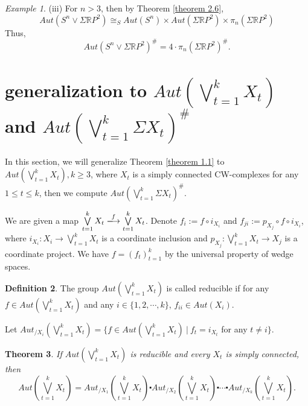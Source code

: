 \documentclass[12pt]{article}
\theoremstyle{theorem}
\newtheorem{theorem}{Theorem}[section]
\theoremstyle{definition}
\newtheorem{definition}[theorem]{Definition}
\theoremstyle{proposition}
\theoremstyle{corollary}
\theoremstyle{lemma}
\theoremstyle{remark}
\theoremstyle{example}
\newtheorem{example}[theorem]{Example}
\begin{document}
{\begin{example}
(iii) For $n>3$, then by Theorem \ref{theorem 2.6},
$$Aut(S^{n}\vee \Sigma \mathbb{R}P^2)\cong_{S}Aut(S^{n})\times Aut(\Sigma\mathbb{R}P^2)\times \pi_{n}(\Sigma\mathbb{R}P^2)$$
 Thus, $$ Aut(S^{n}\vee \Sigma \mathbb{R}P^2)^{\#}=4\cdot\pi_{n}(\Sigma\mathbb{R}P^2)^{\#}.$$
\end{example}

\section{ generalization to $Aut(\bigvee\limits_{t=1}^{k}X_{t})$ and  $Aut(\bigvee\limits_{t=1}^{k}\Sigma X_{t})^{\#}$  }
\label{sec:3}

In this section, we will generalize Theorem \ref{theorem 1.1} to $Aut(\bigvee\limits_{t=1}^{k}X_{t}), k\geq3$, where $X_{t}$ is a simply connected CW-complexes for any $1\leq t\leq k$, then we compute  $Aut(\bigvee\limits_{t=1}^{k}\Sigma X_{t})^{\#}$.

We are given a map $\bigvee\limits_{t=1}^{k}X_{t} \xlongrightarrow{f} \bigvee\limits_{t=1}^{k}X_{t}$. Denote $f_{i}:=f{\ensuremath{{\scriptstyle\circ}}} i_{X_{i}}$ and  $f_{ji}:=p_{X_{j}}{\ensuremath{{\scriptstyle\circ}}} f{\ensuremath{{\scriptstyle\circ}}} i_{X_{i}}$, where $i_{X_{i}}: X_{i}\rightarrow \bigvee\limits_{t=1}^{k}X_{t}$ is a coordinate inclusion and $p_{X_{j}}: \bigvee\limits_{t=1}^{k}X_{t}\rightarrow X_{j}$  is a coordinate project. We have $f=(f_{t})_{t=1}^{k}$  by the universal property of wedge spaces.

 \begin{definition}\label{definition3.1}
The group $Aut(\bigvee\limits_{t=1}^{k}X_{t})$  is
called reducible if for any $f\in Aut(\bigvee\limits_{t=1}^{k}X_{t})$ and any $i\in\{1,2,\cdots,k\}$, $f_{ii}\in Aut(X_{i})$.
  \end{definition}

Let ${\ensuremath{Aut_{/X_{{i}}}(\bigvee\limits_{t=1}^{k}X_{t})}}=\{f\in Aut(\bigvee\limits_{t=1}^{k}X_{t})~|~f_{t}=i_{X_{t}}$ for any $t\neq i\}$.

\begin{theorem}\label{theorem 3.2}
If $ Aut(\bigvee\limits_{t=1}^{k}X_{t})$ is reducible and every $X_{t}$ is simply connected,  then
$$Aut(\bigvee\limits_{t=1}^{k}X_{t})={\ensuremath{Aut_{/X_{{1}}}(\bigvee\limits_{t=1}^{k}X_{t})}}\centerdot{\ensuremath{Aut_{/X_{{2}}}(\bigvee\limits_{t=1}^{k}X_{t})}}\centerdot \cdots\centerdot{\ensuremath{Aut_{/X_{{k}}}(\bigvee\limits_{t=1}^{k}X_{t})}}.$$
\end{theorem}

}
\end{document}
